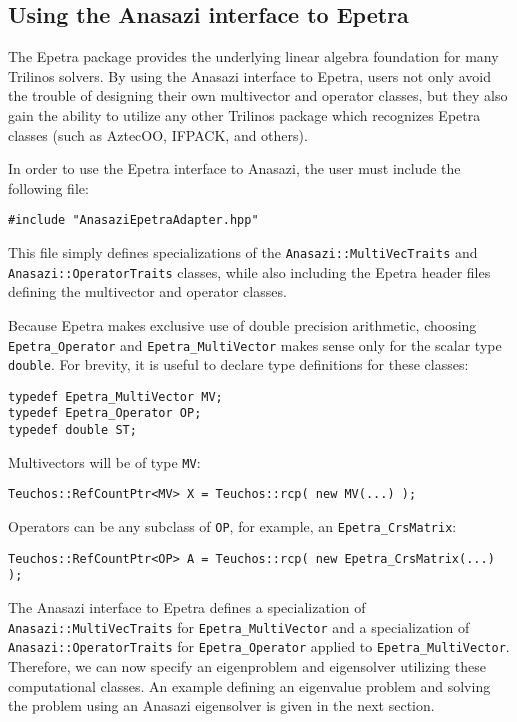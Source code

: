 \subsection{Using the Anasazi interface to Epetra}
\label{sec:anasazi:epetra}

The Epetra package provides the underlying linear algebra foundation for many
Trilinos solvers.  By using the Anasazi interface to Epetra, users not only
avoid the trouble of designing their own multivector and operator classes, but
they also gain the ability to utilize any other Trilinos package which
recognizes Epetra classes (such as AztecOO, IFPACK, and others).

In order to use the Epetra interface to Anasazi, the user must include
the following file:
\begin{verbatim}
#include "AnasaziEpetraAdapter.hpp"
\end{verbatim}
This file simply defines specializations of the \verb!Anasazi::MultiVecTraits!
and \verb!Anasazi::OperatorTraits! classes, while also including the Epetra
header files defining the multivector and operator classes.

Because Epetra makes exclusive use of double precision arithmetic, choosing
\verb!Epetra_Operator! and \verb!Epetra_MultiVector! makes sense only for the
scalar type \verb!double!. For brevity, it is useful to declare type definitions
for these classes:
\begin{verbatim}
typedef Epetra_MultiVector MV;
typedef Epetra_Operator OP;
typedef double ST;
\end{verbatim}

Multivectors will be of type \verb!MV!:
\begin{verbatim}
Teuchos::RefCountPtr<MV> X = Teuchos::rcp( new MV(...) );
\end{verbatim}

Operators can be any subclass of \verb!OP!, for example, an \verb!Epetra_CrsMatrix!:
\begin{verbatim}
Teuchos::RefCountPtr<OP> A = Teuchos::rcp( new Epetra_CrsMatrix(...)  );
\end{verbatim}

The Anasazi interface to Epetra defines a specialization of
\verb!Anasazi::MultiVecTraits! for \verb!Epetra_MultiVector! and a
specialization of \verb!Anasazi::OperatorTraits! for \verb!Epetra_Operator!
applied to \verb!Epetra_MultiVector!. Therefore, we can now specify an
eigenproblem and eigensolver utilizing these computational classes. An example
defining an eigenvalue problem and solving the problem using an Anasazi
eigensolver is given in the next section.

